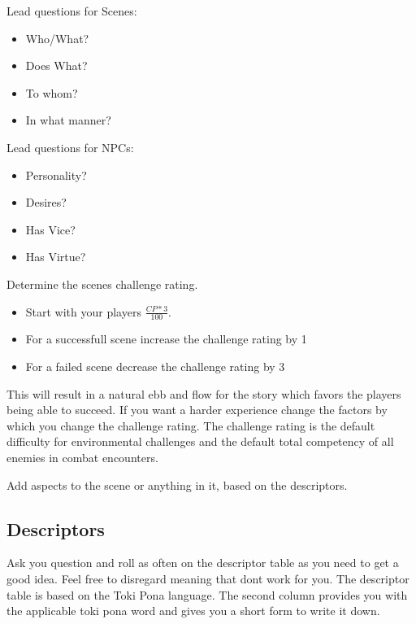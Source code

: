 \documentclass[11pt]{article}
\begin{document}
{\begin{multicols}{2}
Lead questions for Scenes: 
\begin{itemize}
\item Who/What?
\item Does What?
\item To whom?
\item In what manner?
\end{itemize}
\columnbreak
Lead questions for NPCs:
\begin{itemize}
\item Personality?
\item Desires?
\item Has Vice?
\item Has Virtue?
\end{itemize}
\end{multicols}

Determine the scenes challenge rating.
\begin{itemize}
\item Start with your players \(\frac{CP * 3}{100}\).
\item For a successfull scene increase the challenge rating by 1
\item For a failed scene decrease the challenge rating by 3
\end{itemize}

This will result in a natural ebb and flow for the story which favors the players being able to succeed. If you want a harder experience change the factors by which you change the challenge rating. 
The challenge rating is the default difficulty for environmental challenges and the default total competency of all enemies in combat encounters.

Add aspects to the scene or anything in it, based on the descriptors.

\subsection{Descriptors}
\label{sec:org7ebb393}

Ask you question and roll as often on the descriptor table as you need to get a good idea. Feel free to disregard meaning that dont work for you.
The descriptor table is based on the Toki Pona language. The second column provides you with the applicable toki pona word and gives you a short form to write it down. 


\newpage
}
\end{document}

